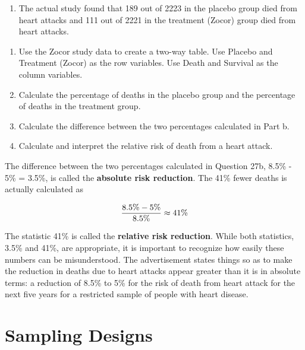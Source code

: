 \documentclass[
]{report}
\providecommand{\tightlist}{%
  \setlength{\itemsep}{0pt}\setlength{\parskip}{0pt}}
\begin{document}
\begin{enumerate}
\def\labelenumi{\arabic{enumi}.}
\setcounter{enumi}{26}
\tightlist
\item
  The actual study found that 189 out of 2223 in the placebo group died from heart attacks and 111 out of 2221 in the treatment (Zocor) group died from heart attacks.\\
\end{enumerate}

\begin{enumerate}
\def\labelenumi{\alph{enumi}.}
\tightlist
\item
  Use the Zocor study data to create a two-way table. Use Placebo and Treatment (Zocor) as the row variables. Use Death and Survival as the column variables.\\
\item
  Calculate the percentage of deaths in the placebo group and the percentage of deaths in the treatment group.\\
\item
  Calculate the difference between the two percentages calculated in Part b.\\
\item
  Calculate and interpret the relative risk of death from a heart attack.
\end{enumerate}

The difference between the two percentages calculated in Question 27b, 8.5\% - 5\% = 3.5\%, is called the \textbf{absolute risk reduction}. The 41\% fewer deaths is actually calculated as

\begin{align}
\frac{8.5\% - 5\%}{8.5\%} \approx 41\% 
\notag
\end{align}

The statistic 41\% is called the \textbf{relative risk reduction}. While both statistics, 3.5\% and 41\%, are appropriate, it is important to recognize how easily these numbers can be misunderstood. The advertisement states things so as to make the reduction in deaths due to heart attacks appear greater than it is in absolute terms: a reduction of 8.5\% to 5\% for the risk of death from heart attack for the next five years for a restricted sample of people with heart disease.

\section{\texorpdfstring{\textbf{Sampling Designs}}{Sampling Designs}}\label{sampling-designs}
\end{document}
